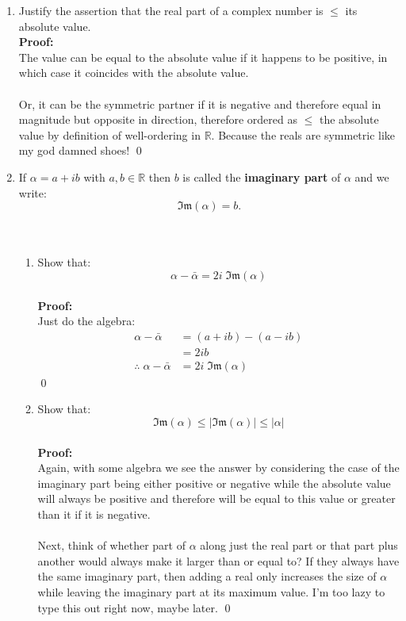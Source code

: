 \begin{enumerate}
	\item Justify the assertion that the real part of a complex number is $\leq$ its absolute value. \\
	
	\textbf{Proof:} \\
	The value can be equal to the absolute value if it happens to be positive, in which case it coincides with the absolute value. \\
	\\
	Or, it can be the symmetric partner if it is negative and therefore equal in magnitude but opposite in direction, therefore ordered as $\le$ the absolute value by definition of well-ordering in $\mathbb{R}$. Because the reals are symmetric like my god damned shoes! 
	\qed
	
	\item If $\alpha = a + ib$ with $a, b \in \mathbb{R}$ then $b$ is called the \textbf{imaginary part} of $\alpha$ and we write: 
	$$\mathfrak{Im}(\alpha) = b.$$ \\
	\\
	\begin{enumerate}
		\item Show that: 
		$$\alpha - \bar{\alpha} = 2i \; \mathfrak{Im}(\alpha)$$ \\

		\textbf{Proof:}\\
		Just do the algebra:
		\begin{align*}
			\alpha - \bar{\alpha} &= (a + ib) - (a - ib) \\
			&= 2ib \\
			\therefore \; \alpha - \bar{\alpha} &= 2i \; \mathfrak{Im}(\alpha)
		\end{align*}
		\qed


		\item Show that:
		$$\mathfrak{Im}(\alpha) \leq \left | \mathfrak{Im}(\alpha) \right | \leq |\alpha|$$ \\

		\textbf{Proof:} \\
		Again, with some algebra we see the answer by considering the case of the imaginary part being either positive or negative while the absolute value will always be positive and therefore will be equal to this value or greater than it if it is negative. \\
		\\
		Next, think of whether part of $\alpha$ along just the real part or that part plus another would always make it larger than or equal to? If they always have the same imaginary part, then adding a real only increases the size of $\alpha$ while leaving the imaginary part at its maximum value. I'm too lazy to type this out right now, maybe later. 
		\qed
	\end{enumerate}
	

\end{enumerate}
